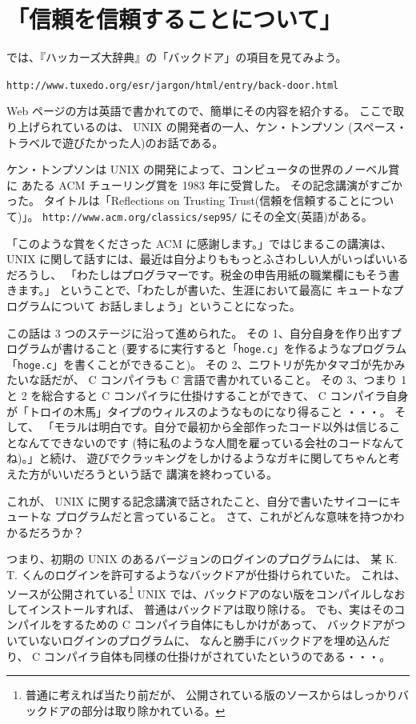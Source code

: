 \documentclass[11pt,titlepage]{jarticle}
\begin{document}
\section{「信頼を信頼することについて」}

では、『ハッカーズ大辞典』の「バックドア」の項目を見てみよう。

\texttt{http://www.tuxedo.org/{\TILDE}esr/jargon/html/entry/back-door.html}

Web ページの方は英語で書かれてので、簡単にその内容を紹介する。
ここで取り上げられているのは、 UNIX の開発者の一人、ケン・トンプソン
(スペース・トラベルで遊びたかった人)のお話である。

ケン・トンプソンは UNIX の開発によって、コンピュータの世界のノーベル賞に
あたる ACM チューリング賞を 1983 年に受賞した。
その記念講演がすごかった。
タイトルは「Reflections on Trusting Trust(信頼を信頼することについて)」。
\texttt{http://www.acm.org/classics/sep95/} にその全文(英語)がある。

「このような賞をくださった ACM に感謝します。」ではじまるこの講演は、
UNIX に関して話すには、最近は自分よりももっとふさわしい人がいっぱいいる
だろうし、
「わたしはプログラマーです。税金の申告用紙の職業欄にもそう書きます。」
ということで、「わたしが書いた、生涯において最高に
キュートなプログラムについて
お話しましょう」ということになった。

この話は 3 つのステージに沿って進められた。
その 1、自分自身を作り出すプログラムが書けること
(要するに実行すると「\texttt{hoge.c}」を作るようなプログラム
「\texttt{hoge.c}」を書くことができること)。
その 2、ニワトリが先かタマゴが先かみたいな話だが、 C コンパイラも C 言語で書かれていること。
その 3、つまり 1 と 2 を総合すると C コンパイラに仕掛けすることができて、
 C コンパイラ自身が「トロイの木馬」タイプのウィルスのようなものになり得ること
・・・。
そして、
「モラルは明白です。自分で最初から全部作ったコード以外は信じることなんてできないのです
(特に私のような人間を雇っている会社のコードなんてね)。」と続け、
遊びでクラッキングをしかけるようなガキに関してちゃんと考えた方がいいだろうという話で
講演を終わっている。

これが、 UNIX に関する記念講演で話されたこと、自分で書いたサイコーにキュートな
プログラムだと言っていること。
さて、これがどんな意味を持つかわかるだろうか？

つまり、初期の UNIX のあるバージョンのログインのプログラムには、
某 K. T. くんのログインを許可するようなバックドアが仕掛けられていた。
これは、ソースが公開されている\footnote{普通に考えれば当たり前だが、
公開されている版のソースからはしっかりバックドアの部分は取り除かれている。}
 UNIX では、バックドアのない版をコンパイルしなおしてインストールすれば、
普通はバックドアは取り除ける。
でも、実はそのコンパイルをするための C コンパイラ自体にもしかけがあって、
バックドアがついていないログインのプログラムに、
なんと勝手にバックドアを埋め込んだり、
 C コンパイラ自体も同様の仕掛けがされていたというのである・・・。
\end{document}
